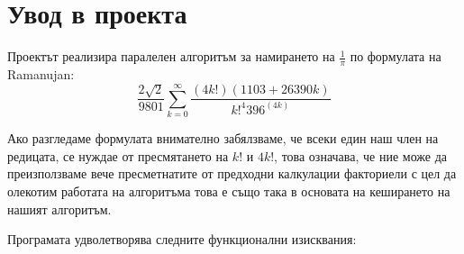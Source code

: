 \documentclass[a4paper,english]{article}
\begin{document}
\maketitle
\newpage
\section{Увод в проекта}
Проектът реализира паралелен алгоритъм за намирането на \begin{math}\frac{1}{\pi}\end{math} по формулата на Ramanujan:
\[
    \frac{2\sqrt{2}}{9801}\sum_{k=0}^{\infty} \frac{(4k!)(1103 + 26390k)}{k!^4 396^(4k)}
\]

Ако разгледаме формулата внимателно забялзваме, че всеки един наш член на редицата, се нуждае от пресмятането на \begin{math}k!\end{math} и \begin{math}4k!\end{math}, това означава, че ние може да преизползваме вече пресметнатите от предходни калкулации факториели с цел да олекотим работата на алгоритъма това е също така в основата на кеширането на нашият алгоритъм.\hfill

\vspace{3mm}

Програмата удволетворява следните функционални изисквания:
\end{document}
